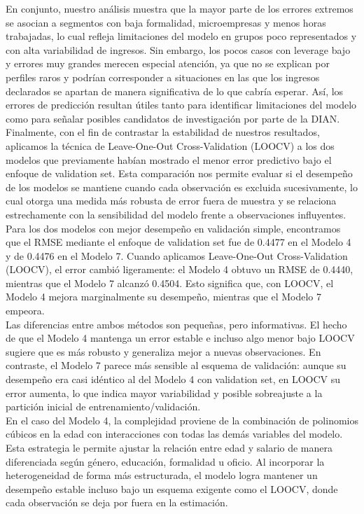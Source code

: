 \documentclass[12pt,a4paper,onecolumn]{article}
\begin{document}
En conjunto, nuestro análisis muestra que la mayor parte de los errores extremos se asocian a segmentos con baja formalidad, microempresas y menos horas trabajadas, lo cual refleja limitaciones del modelo en grupos poco representados y con alta variabilidad de ingresos. Sin embargo, los pocos casos con leverage bajo y errores muy grandes merecen especial atención, ya que no se explican por perfiles raros y podrían corresponder a situaciones en las que los ingresos declarados se apartan de manera significativa de lo que cabría esperar. Así, los errores de predicción resultan útiles tanto para identificar limitaciones del modelo como para señalar posibles candidatos de investigación por parte de la DIAN.\\

Finalmente, con el fin de contrastar la estabilidad de nuestros resultados, aplicamos la técnica de Leave-One-Out Cross-Validation (LOOCV) a los dos modelos que previamente habían mostrado el menor error predictivo bajo el enfoque de validation set. Esta comparación nos permite evaluar si el desempeño de los modelos se mantiene cuando cada observación es excluida sucesivamente, lo cual otorga una medida más robusta de error fuera de muestra y se relaciona estrechamente con la sensibilidad del modelo frente a observaciones influyentes.\\

Para los dos modelos con mejor desempeño en validación simple, encontramos que el RMSE mediante el enfoque de validation set fue de 0.4477 en el Modelo 4 y de 0.4476 en el Modelo 7. Cuando aplicamos Leave-One-Out Cross-Validation (LOOCV), el error cambió ligeramente: el Modelo 4 obtuvo un RMSE de 0.4440, mientras que el Modelo 7 alcanzó 0.4504. Esto significa que, con LOOCV, el Modelo 4 mejora marginalmente su desempeño, mientras que el Modelo 7 empeora.\\

Las diferencias entre ambos métodos son pequeñas, pero informativas. El hecho de que el Modelo 4 mantenga un error estable e incluso algo menor bajo LOOCV sugiere que es más robusto y generaliza mejor a nuevas observaciones. En contraste, el Modelo 7 parece más sensible al esquema de validación: aunque su desempeño era casi idéntico al del Modelo 4 con validation set, en LOOCV su error aumenta, lo que indica mayor variabilidad y posible sobreajuste a la partición inicial de entrenamiento/validación.\\

En el caso del Modelo 4, la complejidad proviene de la combinación de polinomios cúbicos en la edad con interacciones con todas las demás variables del modelo. Esta estrategia le permite ajustar la relación entre edad y salario de manera diferenciada según género, educación, formalidad u oficio. Al incorporar la heterogeneidad de forma más estructurada, el modelo logra mantener un desempeño estable incluso bajo un esquema exigente como el LOOCV, donde cada observación se deja por fuera en la estimación.\\
\end{document}
